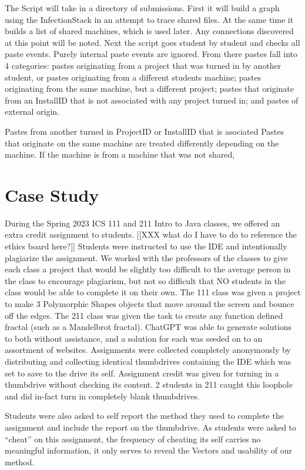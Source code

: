 \documentclass[letterpaper,10pt,conference]{IEEEtran}
\newcommand{\installID}{InstallID\xspace}
\newcommand{\projectID}{ProjectID\xspace}
\newcommand{\infectionStack}{InfectionStack\xspace}
\begin{document}
The Script will take in a directory of submissions.  First it will build a graph using the \infectionStack in an attempt to trace shared files.  At the same time it builds a list of shared machines, which is used later.  Any connections discovered at this point will be noted.  Next the script goes student by student and checks all paste events.  Purely internal paste events are ignored.  From there pastes fall into 4 categories:  pastes originating from a project that was turned in by another student, or pastes originating from a different students machine; pastes originating from the same machine, but a different project; pastes that originate from an \installID that is not associated with any project turned in; and pastes of external origin.

Pastes from another turned in \projectID or \installID that is asociated 
Pastes that originate on the same machine are treated differently depending on the machine.  If the machine is from a machine that was not shared, 

\section{Case Study}
During the Spring 2023 ICS 111 and 211 Intro to Java classes, we offered an extra credit assignment to students. [[XXX what do I have to do to reference the ethics board here?]]
Students were instructed to use the IDE and intentionally plagiarize the assignment.  We worked with the professors of the classes to give each class a project that would be slightly too difficult to the average person in the class to encourage plagiarism, but not so difficult that NO students in the class would be able to complete it on their own.  The 111 class was given a project to make 3 Polymorphic Shapes objects that move around the screen and bounce off the edges.  The 211 class was given the task to create any function defined fractal (such as a Mandelbrot fractal).  ChatGPT was able to generate solutions to both without assistance, and a solution for each was seeded on to an assortment of websites.  Assignments were collected completely anonymously by distributing and collecting identical thumbdrives containing the IDE which was set to save to the drive its self.  Assignment credit was given for turning in a thumbdrive without checking its content.  2 students in 211 caught this loophole and did in-fact turn in completely blank thumbdrives.

Students were also asked to self report the method they used to complete the assignment and include the report on the thumbdrive.  As students were asked to ``cheat'' on this assignment, the frequency of cheating its self carries no meaningful information, it only serves to reveal the Vectors and usability of our method.
\end{document}
